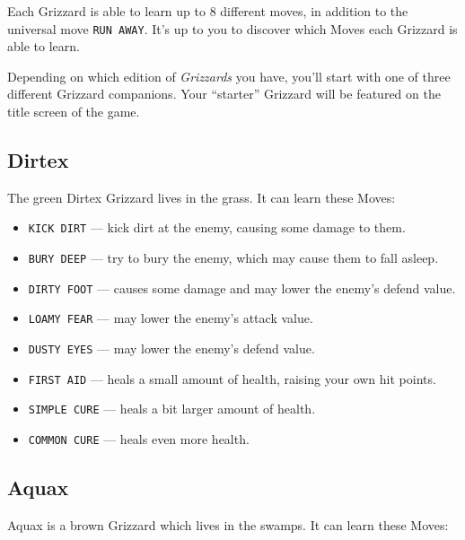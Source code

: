 \documentclass[12pt,openright,book]{memoir}
\begin{document}
\begin{description}
\fi

Each Grizzard is able  to learn up to 8 different  moves, in addition to
the universal move  \texttt{RUN AWAY}. It's up to you  to discover which
Moves each  Grizzard is  able to  learn.

\ifdefined\DEMO\else

Depending on which edition of  \textit{Grizzards} you have, you'll start
with  one  of  three  different Grizzard  companions.  Your  ``starter''
Grizzard will be featured on the title screen of the game.

\subsection{Dirtex}

The green Dirtex Grizzard lives in the grass. It can learn these Moves:

\begin{itemize}
\item \texttt{KICK DIRT} --- kick dirt at the enemy, causing some damage
  to them.
\item \texttt{BURY DEEP} --- try to bury the enemy, which may cause them
  to fall asleep.
\item  \texttt{DIRTY FOOT}  --- causes  some  damage and  may lower  the
  enemy's defend value.
\item \texttt{LOAMY FEAR} --- may lower the enemy's attack value.
\item \texttt{DUSTY EYES} --- may lower the enemy's defend value.
\item \texttt{FIRST  AID} ---  heals a small  amount of  health, raising
  your own hit points.
\item \texttt{SIMPLE CURE} --- heals a bit larger amount of health.
\item \texttt{COMMON CURE} --- heals even more health.
\end{itemize}

\fi

\subsection{Aquax}

Aquax is a brown Grizzard which lives  in the swamps. It can learn these
Moves:


\end{description}
\end{document}
